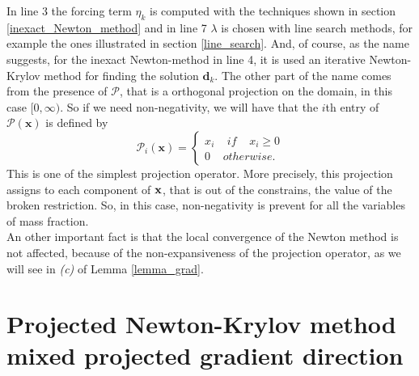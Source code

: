 In line 3 the forcing term $ \eta_k $ is computed with the techniques shown in section \ref{inexact_Newton_method} and in line 7 $ \lambda $ is chosen with line search methods, for example the ones illustrated in section \ref{line_search}. And, of course, as the name suggests, for the inexact Newton-method in line 4, it is used an iterative Newton-Krylov method for finding the solution $\textbf{d}_k $.
The other part of the name comes from the presence of $ \mathcal{P} $, that is a orthogonal projection on the domain, in this case $[0, \infty)$. So if we need non-negativity, we will have that the $i$th entry of $ \mathcal{P}(\textbf{x}) $ is defined by 
\begin{equation*}
\mathcal{P}_i(\textbf{x}) = \begin{cases}
x_i\;\;\;\; if\;\;\;\; x_i \geq 0\\ 0 \;\;\;\; otherwise .
\end{cases}
\end{equation*}
This is one of the simplest projection operator.
More precisely, this projection assigns to each component of $ \textbf{\textbf{x}} $, that is out of the constrains, the value of the broken restriction. So, in this case, non-negativity is prevent for all the variables of mass fraction.\\
An other important fact is that the local convergence of the Newton method is not affected, because of the non-expansiveness of the projection operator, as we will see in \textit{(c)} of Lemma \ref{lemma_grad}.

\section{Projected Newton-Krylov method mixed projected gradient direction}
